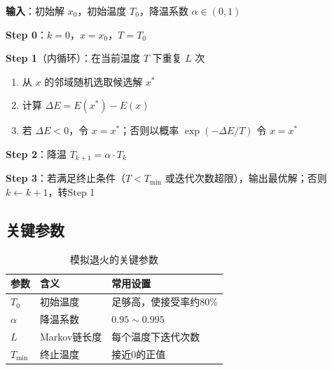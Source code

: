 \begin{algobox}[模拟退火算法]
\textbf{输入}：初始解 $x_0$，初始温度 $T_0$，降温系数 $\alpha \in (0, 1)$

\textbf{Step 0}：$k = 0$，$x = x_0$，$T = T_0$

\textbf{Step 1}（内循环）：在当前温度 $T$ 下重复 $L$ 次
\begin{enumerate}[label=\arabic*., leftmargin=1em]
    \item 从 $x$ 的邻域随机选取候选解 $x^*$
    \item 计算 $\Delta E = E(x^*) - E(x)$
    \item 若 $\Delta E < 0$，令 $x = x^*$；否则以概率 $\exp(-\Delta E / T)$ 令 $x = x^*$
\end{enumerate}

\textbf{Step 2}：降温 $T_{k+1} = \alpha \cdot T_k$

\textbf{Step 3}：若满足终止条件（$T < T_{\min}$ 或迭代次数超限），输出最优解；否则 $k \leftarrow k+1$，转Step 1
\end{algobox}

\subsection{关键参数}

\begin{table}[htbp]
\centering
\caption{模拟退火的关键参数}
\begin{tabular}{@{}lll@{}}
\toprule
\textbf{参数} & \textbf{含义} & \textbf{常用设置} \\
\midrule
$T_0$ & 初始温度 & 足够高，使接受率约80\% \\
$\alpha$ & 降温系数 & $0.95 \sim 0.995$ \\
$L$ & Markov链长度 & 每个温度下迭代次数 \\
$T_{\min}$ & 终止温度 & 接近0的正值 \\
\bottomrule
\end{tabular}
\end{table}

